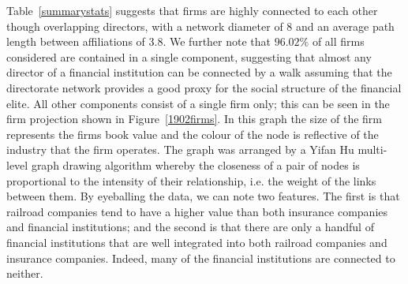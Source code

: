 \begin{table}[t]
\caption{Summary statistics of New York directorate network in 1902.}
\label{summarystats}
\end{table}

Table~\ref{summarystats} suggests that firms are highly connected to each other though overlapping directors, with a network diameter of $8$ and an average path length between affiliations of $3.8$. We further note that $96.02\%$ of all firms considered are contained in a single component, suggesting that almost any director of a financial institution can be connected by a walk assuming that the directorate network provides a good proxy for the social structure of the financial elite. All other components consist of a single firm only; this can be seen in the firm projection shown in Figure~\ref{1902firms}. In this graph the size of the firm represents the firms book value and the colour of the node is reflective of the industry that the firm operates. The graph was arranged by a Yifan Hu multi-level graph drawing algorithm \citep{Hu2005} whereby the closeness of a pair of nodes is proportional to the intensity of their relationship, i.e. the weight of the links between them. By eyeballing the data, we can note two features. The first is that railroad companies tend to have a higher value than both insurance companies and financial institutions; and the second is that there are only a handful of financial institutions that are well integrated into both railroad companies and insurance companies. Indeed, many of the financial institutions are connected to neither.

